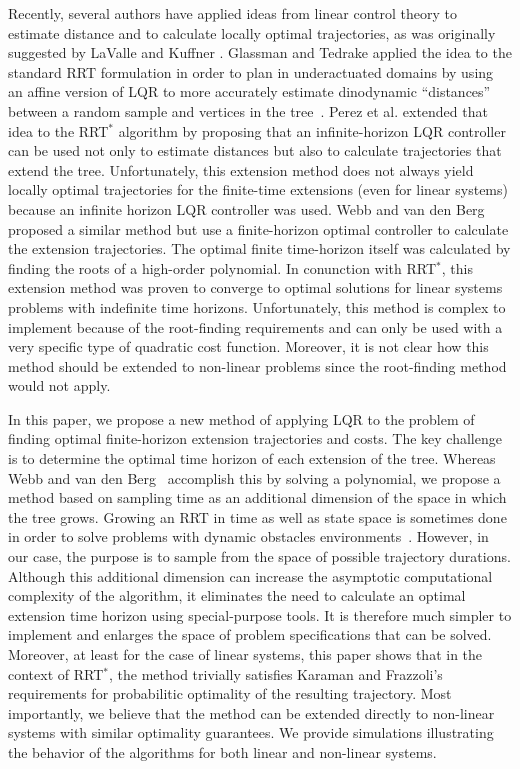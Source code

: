 \documentclass[letterpaper, 10pt, english, conference]{IEEEtran}
\begin{document}
Recently, several authors have applied ideas from linear control
theory to estimate distance and to calculate locally optimal
trajectories, as was originally suggested by LaValle and Kuffner
\cite{lavalle.kuffner.ijrr01}. Glassman and Tedrake applied the idea
to the standard RRT formulation in order to plan in underactuated
domains by using an affine version of LQR to more accurately estimate
dinodynamic ``distances'' between a random sample and vertices in the
tree~\cite{elena.russ.icra10}. Perez et al. \cite{Perez12} extended
that idea to the RRT$^*$ algorithm by proposing that an
infinite-horizon LQR controller can be used not only to estimate
distances but also to calculate trajectories that extend the
tree. Unfortunately, this extension method does not always yield
locally optimal trajectories for the finite-time extensions (even for
linear systems) because an infinite horizon LQR controller was
used. Webb and van den Berg~\cite{jur} proposed a similar method but
use a finite-horizon optimal controller to calculate the extension
trajectories. The optimal finite time-horizon itself was calculated by
finding the roots of a high-order polynomial. In conunction with
RRT$^*$, this extension method was proven to converge to optimal
solutions for linear systems problems with indefinite time
horizons. Unfortunately, this method is complex to implement because
of the root-finding requirements and can only be used with a very
specific type of quadratic cost function. Moreover, it is not clear
how this method should be extended to non-linear problems since the
root-finding method would not apply.

In this paper, we propose a new method of applying LQR to the problem
of finding optimal finite-horizon extension trajectories and
costs. The key challenge is to determine the optimal time horizon of
each extension of the tree. Whereas Webb and van den Berg~\cite{jur}
accomplish this by solving a polynomial, we propose a method based on
sampling time as an additional dimension of the space in which the
tree grows. Growing an RRT in time as well as state space is sometimes
done in order to solve problems with dynamic obstacles
environments~\cite{lavalle_book,stillman?}. However, in our case, the
purpose is to sample from the space of possible trajectory
durations. Although this additional dimension can increase the
asymptotic computational complexity of the algorithm, it eliminates
the need to calculate an optimal extension time horizon using
special-purpose tools. It is therefore much simpler to implement and
enlarges the space of problem specifications that can be
solved. Moreover, at least for the case of linear systems, this paper
shows that in the context of RRT$^*$, the method trivially satisfies
Karaman and Frazzoli's requirements for probabilitic optimality of the
resulting trajectory. Most importantly, we believe that the method can
be extended directly to non-linear systems with similar optimality
guarantees. We provide simulations illustrating the behavior of the
algorithms for both linear and non-linear systems.
\end{document}
